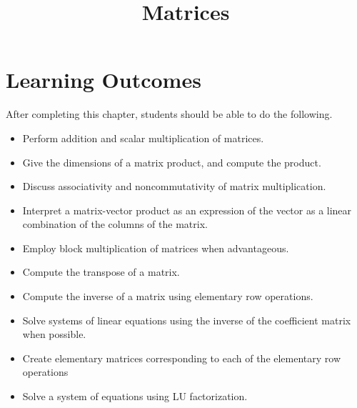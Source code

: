 \documentclass{ximera}
\title{Matrices}
\begin{document}
\begin{abstract}

\end{abstract}
 
\maketitle
 
\section*{Learning Outcomes}
After completing this chapter, students should be able to do the following.
 
\begin{itemize}
    \item Perform addition and scalar multiplication of matrices.
    \item Give the dimensions of a matrix product, and compute the product.
    \item Discuss associativity and noncommutativity of matrix multiplication.
    \item  Interpret a matrix-vector product as an expression of the vector as a linear combination of the columns of the matrix.
    \item Employ block multiplication of matrices when advantageous.
    \item Compute the transpose of a matrix.
    \item Compute the inverse of a matrix using elementary row operations.
    \item  Solve systems of linear equations using the inverse of the coefficient matrix when possible.
    \item Create elementary matrices corresponding to each of the elementary row operations    
    \item Solve a system of equations using LU factorization.

 
\end{itemize}

 
\end{document}

